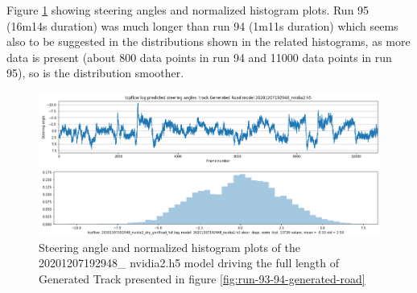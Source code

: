 Figure \ref{fig:20201207192948_nvidia2_dry_genRoad_full} showing steering angles and normalized histogram plots. Run 95 (16m14s duration) was much longer than run 94 (1m11s duration) which seems also to be suggested in the distributions shown in the related histograms, as more data is present (about 800 data points in run 94 and 11000 data points in run 95), so is the distribution smoother.
\begin{figure}[ht]
 \centering 
 \includegraphics[width=\textwidth]{Figures/20201207192948_nvidia2_dry_genRoad_full.png}
 \caption{Steering angle and normalized histogram plots of the 20201207192948\_ nvidia2.h5 model driving the full length of Generated Track presented in figure \ref{fig:run-93-94-generated-road} }
 \label{fig:20201207192948_nvidia2_dry_genRoad_full} 
\end{figure}


